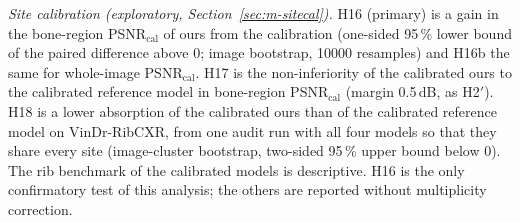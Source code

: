 \emph{Site calibration (exploratory, Section~\ref{sec:m-sitecal}).} H16 (primary) is a gain in the bone-region PSNR$_{\mathrm{cal}}$ of ours
from the calibration (one-sided 95\,\% lower bound of the paired difference above 0; image bootstrap, \num{10000} resamples) and H16b the
same for whole-image PSNR$_{\mathrm{cal}}$. H17 is the non-inferiority of the calibrated ours to the calibrated reference model in
bone-region PSNR$_{\mathrm{cal}}$ (margin 0.5\,dB, as H2$'$). H18 is a lower absorption of the calibrated ours than of the calibrated
reference model on VinDr-RibCXR, from one audit run with all four models so that they share every site (image-cluster bootstrap, two-sided
95\,\% upper bound below 0). The rib benchmark of the calibrated models is descriptive. H16 is the only confirmatory test of this analysis;
the others are reported without multiplicity correction.

